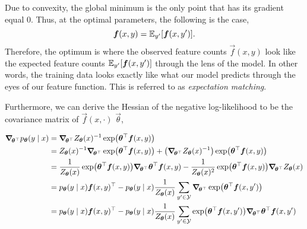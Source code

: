 Due to convexity, the global minimum is the only point that has its gradient
equal $0$. Thus, at the optimal parameters, the following is the case, \[
    \bm{f}(x,y) = \mathbb{E}_{y'} [\bm{f}(x,y')].
\]
Therefore, the optimum is where the observed feature counts $\vec{f}(x,y)$ look
like the expected feature counts $\mathbb{E}_{y'} [\bm{f}(x,y')]$ through the lens of
the model. In other words, the training data looks exactly like what our model
predicts through the eyes of our feature function. This is referred to as
\textit{expectation matching}.

Furthermore, we can derive the Hessian of the negative log-likelihood to be the
covariance matrix of $\vec{f}(x,\cdot)$ \wrt $\vec{\theta}$,

\begin{align*}
    \grad{p_{\vec{\theta}}(y\mid x)}{\transpose{\vec{\theta}}} & = \grad{Z_{\vec{\theta}}(x)^{-1} \exp \lft( \transpose{\vec{\theta}} \vec{f}(x,y) \rgt)}{\transpose{\vec{\theta}}}                                                                                                                                                                                          \\
                                                               & = Z_{\vec{\theta}}(x)^{-1} \grad{\exp \lft( \transpose{\vec{\theta}} \vec{f}(x,y) \rgt)}{\transpose{\vec{\theta}}} + \lft( \grad{Z_{\vec{\theta}}(x)^{-1}}{\transpose{\vec{\theta}}} \rgt) \exp \lft( \transpose{\vec{\theta}} \vec{f}(x,y) \rgt)                                                           \\
                                                               & = \frac{1}{Z_{\vec{\theta}}(x)} \exp \lft( \transpose{\vec{\theta}} \vec{f}(x,y) \rgt) \grad{\transpose{\vec{\theta}} \vec{f}(x,y)}{\transpose{\vec{\theta}}} - \frac{1}{Z_{\vec{\theta}}(x)^2} \exp \lft( \transpose{\vec{\theta}} \vec{f}(x,y) \rgt) \grad{Z_{\vec{\theta}}(x)}{\transpose{\vec{\theta}}} \\
                                                               & = p_{\vec{\theta}}(y\mid x) \transpose{\vec{f}(x,y)} - p_{\vec{\theta}}(y\mid x) \frac{1}{Z_{\vec{\theta}}(x)} \sum_{y'\in\mathcal{Y}} \grad{\exp \lft( \transpose{\vec{\theta}} \vec{f}(x,y') \rgt)}{\transpose{\vec{\theta}}}                                                                             \\
                                                               & = p_{\vec{\theta}}(y\mid x) \transpose{\vec{f}(x,y)} - p_{\vec{\theta}}(y\mid x) \frac{1}{Z_{\vec{\theta}}(x)} \sum_{y'\in\mathcal{Y}} \exp \lft( \transpose{\vec{\theta}} \vec{f}(x,y') \rgt) \grad{\transpose{\vec{\theta}} \vec{f}(x,y')}{\transpose{\vec{\theta}}}                                      \\

\end{align*}
